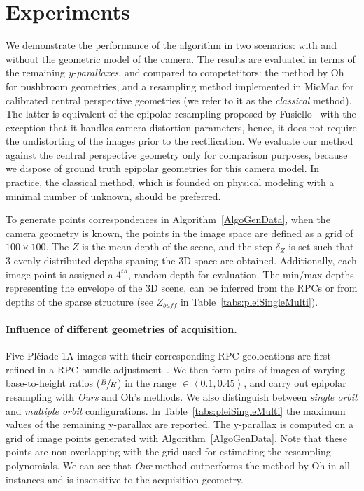 \documentclass{ipol}
\begin{document}

\section{Experiments}\label{sec:experiments}

We demonstrate the performance of the algorithm in two scenarios: with and without the geometric model of the camera. The results are evaluated in terms of the remaining \textit{y-parallaxes}, and compared to competetitors: the method by Oh~\cite{Oh2011} for pushbroom geometries, and a resampling method implemented in MicMac for calibrated central perspective geometries (we refer to it as the \textit{classical} method). The latter is equivalent of the epipolar resampling proposed by Fusiello~\cite{fusiello2000epi} with the exception that it handles camera distortion parameters, hence, it does not require the undistorting of the images prior to the rectification. {We evaluate our method against the central perspective geometry only for comparison purposes, because we dispose of ground truth epipolar geometries for this camera model. In practice, the classical method, which is founded on physical modeling with a minimal number of unknown, should be preferred.}

%

To generate points correspondences in Algorithm~\ref{AlgoGenData}, when the camera geometry is known, the points in the image space are defined as a grid of $100 \times 100$. The $Z$ is the mean depth of the scene, and the step $\delta_Z$ is set such that 3 evenly distributed depths spaning the 3D space are obtained. Additionally, each image point is assigned a $4^{th}$, random depth {for evaluation}.  The min/max depths representing the envelope of the 3D scene, can be inferred from the RPCs or from  depths of the sparse structure (see $Z_{buff}$ in Table~\ref{tabs:pleiSingleMulti}).  
 

\paragraph{Influence of different geometries of acquisition.}
% 
Five Pl\'eiade-1A  images with their corresponding RPC geolocations are first refined in a RPC-bundle adjustment~\cite{rupnika2016refined}. We then form pairs of images of varying base-to-height ratios ($\sfrac{B}{H}$) in the range $\in \left< 0.1,0.45 \right> $, and carry out epipolar resampling with \textit{Ours} and Oh's methods. We also distinguish between \textit{single orbit} and \textit{multiple orbit} configurations. In Table~\ref{tabs:pleiSingleMulti} the maximum values of the remaining y-parallax are reported. The y-parallax is computed on a grid of image points generated with Algorithm~\ref{AlgoGenData}. Note that these points are non-overlapping with the grid used for estimating the resampling polynomials. We can see that \textit{Our} method outperforms the method by Oh in all instances and is insensitive to the acquisition geometry.
\end{document}
